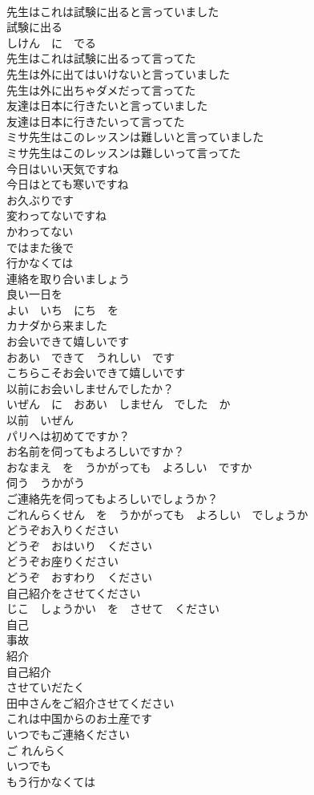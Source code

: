 \documentclass[8pt]{extreport}
\begin{document}
\begin{CJK}{UTF8}{min}
\\	先生はこれは試験に出ると言っていました	
\\	試験に出る 
\\	しけん　に　でる
\\	先生はこれは試験に出るって言ってた	
\\	先生は外に出てはいけないと言っていました	
\\	先生は外に出ちゃダメだって言ってた	
\\	友達は日本に行きたいと言っていました	
\\	友達は日本に行きたいって言ってた	
\\	ミサ先生はこのレッスンは難しいと言っていました	
\\	ミサ先生はこのレッスンは難しいって言ってた	
\\	今日はいい天気ですね	
\\	今日はとても寒いですね	
\\	お久ぶりです	
\\	変わってないですね	
\\	かわってない
\\	ではまた後で	
\\	行かなくては	
\\	連絡を取り合いましょう	
\\	良い一日を	
\\	よい　いち　にち　を
\\	カナダから来ました	
\\	お会いできて嬉しいです	
\\	おあい　できて　うれしい　です	
\\	こちらこそお会いできて嬉しいです	
\\	以前にお会いしませんでしたか？	
\\	いぜん　に　おあい　しません　でした　か
\\	以前　いぜん 
\\	パリへは初めてですか？	
\\	お名前を伺ってもよろしいですか？	
\\	おなまえ　を　うかがっても　よろしい　ですか
\\	伺う　うかがう　
\\	ご連絡先を伺ってもよろしいでしょうか？	
\\	ごれんらくせん　を　うかがっても　よろしい　でしょうか
\\	どうぞお入りください	
\\	どうぞ　おはいり　ください
\\	どうぞお座りください	
\\	どうぞ　おすわり　ください	
\\	自己紹介をさせてください	
\\	じこ　しょうかい　を　させて　ください
\\	自己 
\\	事故 
\\	紹介 
\\	自己紹介 
\\	させていだたく 
\\	田中さんをご紹介させてください	
\\	これは中国からのお土産です	
\\	いつでもご連絡ください	
\\	ご れんらく 
\\	いつでも 
\\	もう行かなくては	
\end{CJK}
\end{document}
